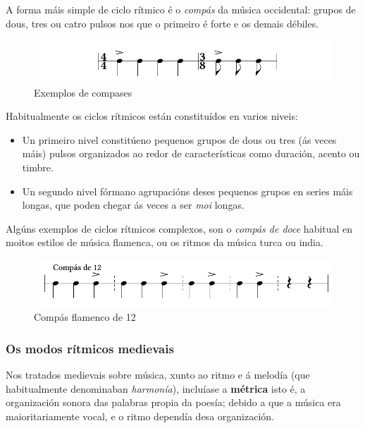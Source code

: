 \documentclass[a4paper, twoside]{templates/ociamthesis}
\providecommand{\tightlist}{%
  \setlength{\itemsep}{0pt}\setlength{\parskip}{0pt}}
\begin{document}
A forma máis simple de ciclo rítmico é o \emph{compás} da música occidental: grupos de dous, tres ou catro pulsos nos que o primeiro é forte e os demais débiles.

\begin{figure}
\centering
\includegraphics{figures/ud-03/compases.png}
\caption{Exemplos de compases}
\end{figure}

Habitualmente os ciclos rítmicos están constituídos en varios niveis:

\begin{itemize}
\tightlist
\item
  Un primeiro nivel constitúeno pequenos grupos de dous ou tres (ás veces máis) pulsos organizados ao redor de características como duración, acento ou timbre.
\item
  Un segundo nivel fórmano agrupacións deses pequenos grupos en series máis longas, que poden chegar ás veces a ser \emph{moi} longas.
\end{itemize}

Algúns exemplos de ciclos rítmicos complexos, son o \emph{compás de doce} habitual en moitos estilos de música flamenca, ou os ritmos da música turca ou india.

\begin{figure}
\centering
\includegraphics{figures/ud-03/ciclos-1.png}
\caption{Compás flamenco de 12}
\end{figure}

\hypertarget{os-modos-ruxedtmicos-medievais}{%
\subsubsection*{Os modos rítmicos medievais}\label{os-modos-ruxedtmicos-medievais}}

Nos tratados medievais sobre música, xunto ao ritmo e á melodía (que habitualmente denominaban \emph{harmonía}), incluíase a \textbf{métrica} isto é, a organización sonora das palabras propia da poesía; debido a que a música era maioritariamente vocal, e o ritmo dependía desa organización.
\end{document}
